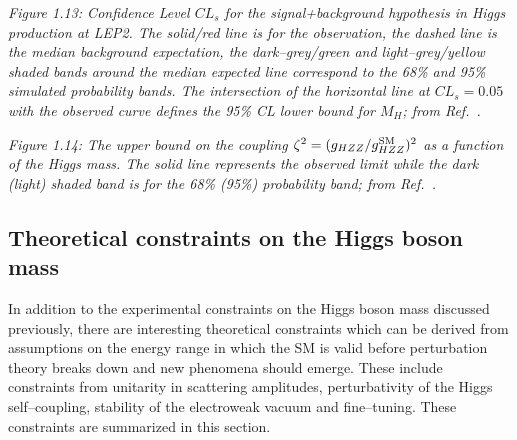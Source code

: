 \begin{figure}[htbp]
\begin{center}
\vspace*{-.5cm}
\end{center}
\vspace*{-1cm}
\end{figure}
%
{\it Figure 1.13: Confidence Level $CL_s$ for the signal+background hypothesis
in Higgs production at LEP2. The solid/red line is for the observation, the 
dashed line is the median background expectation, the dark--grey/green and 
light--grey/yellow shaded bands around the median expected line correspond to 
the 68\% and 95\% simulated probability bands. The  intersection of the 
horizontal line at $CL_s = 0.05$ with the observed curve  defines the 95\% CL  
lower bound for $M_H$; from Ref.~\cite{LEP2-Higgs-exp}.}

\vspace*{.5cm}

\begin{figure}[htbp]
\begin{center}
\vspace*{-.5cm}
\end{center}
\vspace*{-1cm}
\end{figure}
%
{\it Figure 1.14: The upper bound on the coupling $\zeta^2=(g_{HZZ}/g_{HZZ}^{
\rm SM})^2$ as a function of the Higgs mass. The solid line represents the 
observed limit while the dark (light) shaded band is for the 68\% (95\%) 
probability band; from Ref.~\cite{LEP2-Higgs-exp}.}

\subsection{Theoretical constraints on the Higgs boson mass}

In addition to the experimental constraints on the Higgs boson mass discussed
previously,  there are interesting theoretical constraints
which can be derived from assumptions  on the energy range in which the SM is
valid before perturbation theory breaks down and new phenomena should emerge.
These include constraints from unitarity in scattering amplitudes, 
perturbativity of the Higgs self--coupling, stability of the electroweak 
vacuum and fine--tuning. These constraints are summarized in this 
section. 

